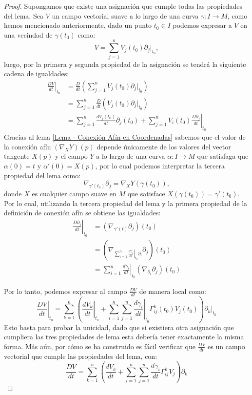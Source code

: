 \begin{proof}
	Supongamos que existe una asignación que cumple todas las propiedades del lema. Sea $V$ un campo vectorial suave a lo largo de una curva $\gamma: I \to M$, como hemos mencionado anteriormente, dado un punto $t_{0} \in I$ podemos expresar a $V$ en una vecindad de $\gamma(t_{0})$ como:
	\[
		V = \sum_{j=1}^{n} V_{j}(t_{0}) \partial_{j}|_{t_{0}},
	\]
	luego, por la primera y segunda propiedad de la asignación se tendrá la siguiente cadena de igualdades:
	\begin{align*}
		\left. \frac{DV}{dt} \right|_{t_{0}}
		 & = \frac{D}{dt} \left( \sum_{j=1}^{n} V_{j}(t_{0}) \partial_{j}|_{t_{0}} \right) \\
		 & = \sum_{j=1}^{n} \frac{D}{dt} ( V_{j}(t_{0}) \partial_{j}|_{t_{0}})             \\
		 & = \sum_{j=1}^{n} \frac{dV_{j}(t_{0})}{dt} \partial_{j}(t_{0})
		+ \sum_{j=1}^{n} V_{i}(t_{0}) \left. \frac{D\partial_{j}}{dt} \right|_{t_{0}}
	\end{align*}
	Gracias al lema \ref{Lema - Conexión Afín en Coordenadas} sabemos que el valor de la conexión afín $(\nabla_{X}Y)(p)$ depende únicamente de los valores del vector tangente $ X(p) $ y el campo $ Y $ a lo largo de una curva $\alpha: I \to M$ que satisfaga que $\alpha(0) = t$ y $\alpha'(0) = X(p)$, por lo cual podemos interpretar la tercera propiedad del lema como:
	\[
		\nabla_{\gamma'(t_{0})}\partial_{j} = \nabla_{X}Y (\gamma(t_{0})),
	\]
	donde $X$ es cualquier campo suave en $M$ que satisface $X(\gamma(t_{0})) = \gamma'(t_{0})$. Por lo cual, utilizando la tercera propiedad del lema y la primera propiedad de la definición de conexión afín se obtiene las igualdades:
	\begin{align*}
		\left. \frac{D\partial_{j}}{dt} \right|_{t_{0}}
		 & = (\nabla_{\gamma'(t)}\partial_{j})(t_{0})                                                                 \\
		 & = \left(
		\nabla_{\sum_{i=1}^{n} \left. \frac{d\gamma_{i}}{dt} \right|_{t_{0}}  \partial_{i}} \partial_{j}
		\right) (t_{0})                                                                                               \\
		 & = \sum_{i=1}^{n} \left. \frac{d\gamma_{i}}{dt} \right|_{t_{0}} (\nabla_{\partial_{i}} \partial_{j})(t_{0})
	\end{align*}

	Por lo tanto, podemos expresar al campo $\frac{DV}{dt}$ de manera local como:
	\[
		\left. \frac{DV}{dt} \right|_{t_{0}} =
		\sum_{k=1}^{n} \left(
		\left. \frac{dV_{k}}{dt} \right|_{t_{0}} +
		\sum_{i=1}^{n}\sum_{j=1}^{n} \left. \frac{d\gamma_{i}}{dt} \right|_{t_{0}}
		\Gamma_{ij}^{k}(t_{0}) V_{j}(t_{0})
		\right) \partial_{k}|_{t_0}
	\]
	Esto basta para probar la unicidad, dado que si existiera otra asignación que cumpliera las tres propiedades de lema esta debería tener exactamente la misma forma. Más aún, por cómo se ha construido es fácil verificar que $\frac{DV}{dt}$ es un campo vectorial que cumple las propiedades del lema, con:
	\[
		\frac{DV}{dt} = \sum_{k=1}^{n} \left(\frac{dV_{k}}{dt}
		+ \sum_{i=1}^{n}\sum_{j=1}^{n} \frac{d\gamma_{i}}{dt} \Gamma_{ij}^{k} V_{j}\right) \partial_{k}
	\]
\end{proof}

